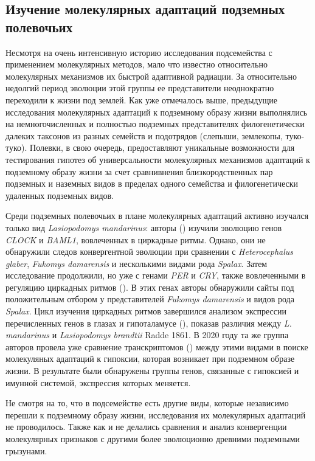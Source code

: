 \subsection{Изучение молекулярных адаптаций подземных полевочьих}

Несмотря на очень интенсивную историю исследования подсемейства с применением молекулярных методов, мало что известно относительно молекулярных механизмов их быстрой адаптивной радиации. За относительно недолгий период эволюции этой группы ее представители неоднократно переходили к жизни под землей. Как уже отмечалось выше, предыдущие исследования молекулярных адаптаций к подземному образу жизни выполнялись на немногочисленных и полностью подземных представителях филогенетически далеких таксонов из разных семейств и подотрядов (слепыши, землекопы, туко-туко). Полевки, в свою очередь, предоставляют уникальные возможности для тестирования гипотез об универсальности молекулярных механизмов адаптаций к подземному образу жизни за счет сравнивнения близкородственных пар подземных и наземных видов в пределах одного семейства и филогенетически удаленных подземных видов. 

Среди подземных полевочьих в плане молекулярных адаптаций активно изучался только вид \textit{Lasiopodomys mandarinus}: авторы (\cite{Sun2018a}) изучили эволюцию генов \textit{CLOCK} и \textit{BAML1}, вовлеченных в циркадные ритмы. Однако, они не обнаружили следов конвергентной эволюции при сравнении с \textit{Heterocephalus glaber}, \textit{Fukomys damarensis} и несколькими видами рода \textit{Spalax}. Затем исследование продолжили, но уже с генами \textit{PER} и \textit{CRY}, также вовлеченными в регуляцию циркадных ритмов (\cite{Sun2018}). В этих генах авторы обнаружили сайты под положительным отбором у представителей \textit{Fukomys damarensis} и видов рода \textit{Spalax}. Цикл изучения циркадных ритмов завершился анализом экспрессии перечисленных генов в глазах и гипоталамусе (\cite{Sun2020}), показав различия между \textit{L. mandarinus} и \textit{Lasiopodomys brandtii} Radde 1861. В 2020 году та же группа авторов провела уже сравнение транскриптомов (\cite{Dong2020}) между этими видами в поиске молекуляных адаптаций к гипоксии, которая возникает при подземном образе жизни. В результате были обнаружены группы генов, связанные с гипоксией и имунной системой, экспрессия которых меняется. 

Не смотря на то, что в подсемействе есть другие виды, которые независимо перешли к подземному образу жизни, исследования их молекулярных адаптаций не проводилось. Также как и не делались сравнения и анализ конвергенции молекулярных признаков с другими более эволюционно древними подземными грызунами.
 